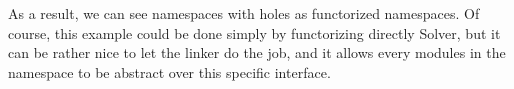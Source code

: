 \documentclass[11pt,a4paper]{article}
\begin{document}
\medskip

As a result, we can see namespaces with holes as functorized namespaces. Of
course, this example could be done simply by functorizing directly Solver, but
it can be rather nice to let the linker do the job, and it allows every modules
in the namespace to be abstract over this specific interface.

\end{document}
